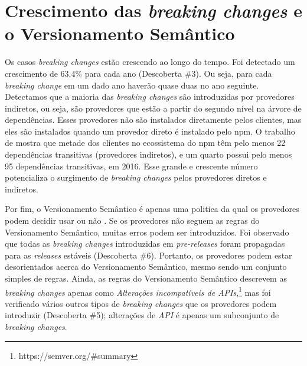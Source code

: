 \section{Crescimento das \textit{breaking changes} e o Versionamento Semântico}
\label{sub:disc:3}
Os casos \textit{breaking changes} estão crescendo ao longo do tempo. Foi detectado um crescimento de 63.4\% para cada ano (Descoberta \#3). Ou seja, para cada \textit{breaking change} em um dado ano haverão quase duas no ano seguinte. Detectamos que a maioria das \textit{breaking changes} são introduzidas por provedores indiretos, ou seja, são provedores que estão a partir do segundo nível na árvore de dependências. Esses provedores não são instalados diretamente pelos clientes, mas eles são instalados quando um provedor direto é instalado pelo \textsf{npm}. O trabalho de  mostra que metade dos clientes no ecossistema do \textsf{npm} têm pelo menos 22 dependências transitivas (provedores indiretos), e um quarto possui pelo menos 95 dependências transitivas, em 2016. Esse grande e crescente número potencializa o surgimento de \textit{breaking changes} pelos provedores diretos e indiretos.

Por fim, o Versionamento Semântico é apenas uma politica da qual os provedores podem decidir usar ou não \cite{decan}. Se os provedores não seguem as regras do Versionamento Semântico, muitas erros podem ser introduzidos. Foi observado que todas as \textit{breaking changes} introduzidas em \textit{pre-releases} foram propagadas para as \textit{releases} estáveis (Descoberta \#6). Portanto, os provedores podem estar desorientados acerca do Versionamento Semântico, mesmo sendo um conjunto simples de regras. Ainda, as regras do Versionamento Semântico descrevem as \textit{breaking changes} apenas como \textit{Alterações incompatíveis de APIs},\footnote{https://semver.org/\#summary} mas foi verificado vários outros tipos de \textit{breaking changes} que os provedores podem introduzir (Descoberta \#5); alterações de \textit{API} é apenas um subconjunto de \textit{breaking changes}.